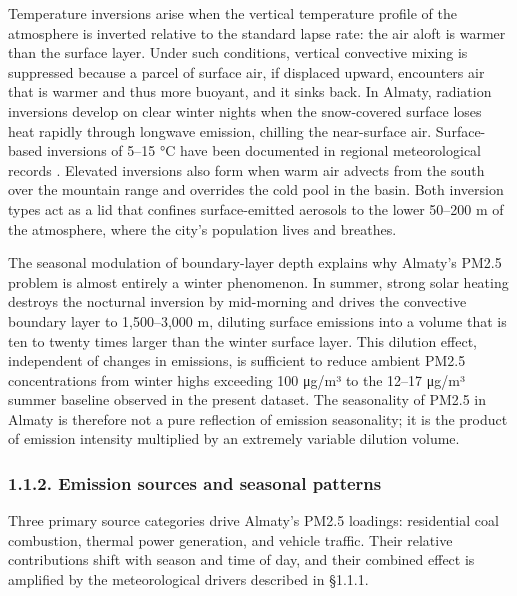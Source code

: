 Temperature inversions arise when the vertical temperature profile of the atmosphere is inverted relative to the standard lapse rate: the air aloft is warmer than the surface layer. Under such conditions, vertical convective mixing is suppressed because a parcel of surface air, if displaced upward, encounters air that is warmer and thus more buoyant, and it sinks back. In Almaty, radiation inversions develop on clear winter nights when the snow-covered surface loses heat rapidly through longwave emission, chilling the near-surface air. Surface-based inversions of 5--15 °C have been documented in regional meteorological records \cite{Tursumbayeva2022}. Elevated inversions also form when warm air advects from the south over the mountain range and overrides the cold pool in the basin. Both inversion types act as a lid that confines surface-emitted aerosols to the lower 50--200 m of the atmosphere, where the city's population lives and breathes.

The seasonal modulation of boundary-layer depth explains why Almaty's PM2.5 problem is almost entirely a winter phenomenon. In summer, strong solar heating destroys the nocturnal inversion by mid-morning and drives the convective boundary layer to 1,500--3,000 m, diluting surface emissions into a volume that is ten to twenty times larger than the winter surface layer. This dilution effect, independent of changes in emissions, is sufficient to reduce ambient PM2.5 concentrations from winter highs exceeding 100 μg/m³ to the 12--17 μg/m³ summer baseline observed in the present dataset. The seasonality of PM2.5 in Almaty is therefore not a pure reflection of emission seasonality; it is the product of emission intensity multiplied by an extremely variable dilution volume.

\subsubsection{1.1.2. Emission sources and seasonal patterns}\label{emission-sources-and-seasonal-patterns}

Three primary source categories drive Almaty's PM2.5 loadings: residential coal combustion, thermal power generation, and vehicle traffic. Their relative contributions shift with season and time of day, and their combined effect is amplified by the meteorological drivers described in §1.1.1.

